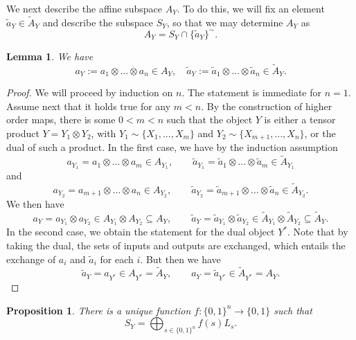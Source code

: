 \documentclass[12pt]{article}
\newtheorem{lemma}{Lemma}
\newtheorem{prop}{Proposition}
\theoremstyle{definition}
\theoremstyle{remark}
\begin{document}
We next describe the affine subspace $A_Y$. To do this, we will fix an element 
$\tilde a_Y\in \tilde A_Y$ and describe the subspace $S_Y$, so that we may determine $A_Y$ as
\[
A_Y=S_Y\cap\{\tilde a_Y\}^\sim.
\]


\begin{lemma}\label{lemma:La} We have
\[
a_Y:=a_{1}\otimes \dots \otimes a_{n}\in A_Y,\quad \tilde a_Y:=\tilde a_{1}\otimes
\dots \otimes \tilde a_{n}\in \tilde A_Y.
\]

\end{lemma}

\begin{proof} We will proceed by induction on $n$.  The statement is immediate for $n=1$.
Assume next that it holds true for any $m<n$. By the construction of higher order maps, 
there is some $0<m<n$ such that 
the object $Y$ is either a tensor product
$Y=Y_1\otimes Y_2$, with $Y_1\sim\{X_{1},\dots,X_{m}\}$ and
$Y_2\sim\{X_{m+1},\dots,X_{n}\}$, or
the dual of such a product. In the first case, we have by the induction assumption
\[
a_{Y_1}=a_{1}\otimes\dots\otimes
a_{m}\in A_{Y_1},  \qquad \tilde a_{Y_1}=\tilde a_{1}\otimes\dots\otimes
\tilde a_{m}\in \tilde A_{Y_1}
\]
and 
\[
a_{Y_2}=a_{m+1}\otimes\dots\otimes
a_{n}\in A_{Y_2},  \qquad \tilde a_{Y_2}=\tilde a_{m+1}\otimes\dots\otimes
\tilde a_{n}\in \tilde A_{Y_2}.
\]
We then have
\[
a_Y=a_{Y_1}\otimes a_{Y_2}\in A_{Y_1}\otimes A_{Y_2}\subseteq A_Y,\qquad 
\tilde a_Y=\tilde a_{Y_1}\otimes \tilde a_{Y_2}\in \tilde A_{Y_1}\otimes \tilde
A_{Y_2}\subseteq \tilde A_Y.
\]
In the second case, we obtain  the statement for the dual object $Y^*$. Note that by taking
the dual, the sets of inputs and outputs are exchanged, which entails  the exchange of
$a_i$ and $\tilde a_i$ for each $i$. But then we have
\[
\tilde a_Y=a_{Y^*}\in A_{Y^*}=\tilde A_Y,\qquad a_Y=\tilde a_{Y^*}\in \tilde A_{Y^*}=A_Y.
\]

\end{proof}



\begin{prop}\label{prop:boolean}
There is a unique function $f:\{0,1\}^n\to \{0,1\}$ such that 
\[
S_Y=\bigoplus_{s\in \{0,1\}^n} f(s) L_s.
\]


\end{prop}
\end{document}
